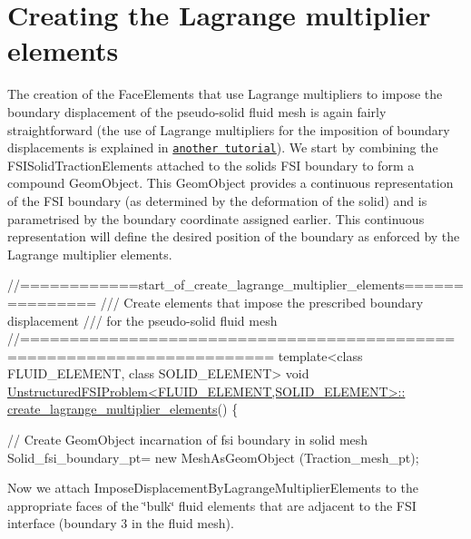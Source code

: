 

\hypertarget{index_create_lagr}{}\section{Creating the Lagrange multiplier elements}\label{index_create_lagr}
The creation of the {\ttfamily Face\+Elements} that use Lagrange multipliers to impose the boundary displacement of the pseudo-\/solid fluid mesh is again fairly straightforward (the use of Lagrange multipliers for the imposition of boundary displacements is explained in \href{../../../solid/prescribed_displ_lagr_mult/html/index.html}{\tt another tutorial}). We start by combining the {\ttfamily F\+S\+I\+Solid\+Traction\+Elements} attached to the solid\textquotesingle{}s F\+SI boundary to form a compound {\ttfamily Geom\+Object}. This {\ttfamily Geom\+Object} provides a continuous representation of the F\+SI boundary (as determined by the deformation of the solid) and is parametrised by the boundary coordinate assigned earlier. This continuous representation will define the desired position of the boundary as enforced by the Lagrange multiplier elements.


\begin{DoxyCodeInclude}



\textcolor{comment}{//============start\_of\_create\_lagrange\_multiplier\_elements===============}\textcolor{comment}{}
\textcolor{comment}{/// Create elements that impose the prescribed boundary displacement}
\textcolor{comment}{/// for the pseudo-solid fluid mesh}
\textcolor{comment}{}\textcolor{comment}{//=======================================================================}
\textcolor{keyword}{template}<\textcolor{keyword}{class} FLUID\_ELEMENT, \textcolor{keyword}{class} SOLID\_ELEMENT>
\textcolor{keywordtype}{void} \hyperlink{classUnstructuredFSIProblem_a6f810c300f373cfc79e23d58f95944e3}{UnstructuredFSIProblem<FLUID\_ELEMENT,SOLID\_ELEMENT>::}
\hyperlink{classUnstructuredFSIProblem_a6f810c300f373cfc79e23d58f95944e3}{create\_lagrange\_multiplier\_elements}()
\{

 \textcolor{comment}{// Create  GeomObject incarnation of fsi boundary in solid mesh}
 Solid\_fsi\_boundary\_pt=
  \textcolor{keyword}{new} MeshAsGeomObject
  (Traction\_mesh\_pt);

\end{DoxyCodeInclude}


Now we attach {\ttfamily Impose\+Displacement\+By\+Lagrange\+Multiplier\+Elements} to the appropriate faces of the \char`\"{}bulk\char`\"{} fluid elements that are adjacent to the F\+SI interface (boundary 3 in the fluid mesh).


